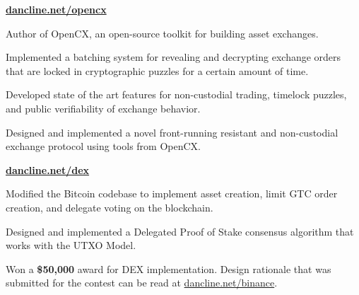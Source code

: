 
\hfill \href{https://dancline.net/opencx}{\textbf{dancline.net/opencx}}
\begin{tightemize}
  \item Author of OpenCX, an open-source toolkit for building asset exchanges.
  \item Implemented a batching system for revealing and decrypting exchange orders that are locked in cryptographic puzzles for a certain amount of time.
  \item Developed state of the art features for non-custodial trading,
      timelock puzzles, and public verifiability of exchange behavior.
  \item Designed and implemented a novel front-running resistant and non-custodial exchange protocol using tools from OpenCX.
\end{tightemize}
\subsectionsep


\hfill \href{https://dancline.net/dex}{\textbf{dancline.net/dex}}
\begin{tightemize}
  \item Modified the Bitcoin codebase to implement asset creation, limit GTC
    order creation, and delegate voting on the blockchain.
  \item Designed and implemented a Delegated Proof of
      Stake consensus algorithm that works with the UTXO Model.
  \item Won a \textbf{\$50,000} award for DEX implementation.  Design rationale
      that was submitted for the contest can be read at
      \href{https://dancline.net/binance/}{dancline.net/binance}.
\end{tightemize}
